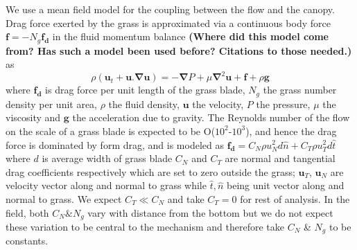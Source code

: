 \documentclass[aps,prl,twocolumn,showpacs,superscriptaddress,groupedaddress,10pt]{revtex4-1}  %
\newcommand{\bu}{\mathbf{u}}
\newcommand{\grad}{\mathbf{\nabla}}
\newcommand{\shreyas}[1]{{\bf (#1)}}
\begin{document}
We use a mean field model for the coupling between the flow and the canopy. Drag force exerted by the grass is approximated via a 
continuous body force $\mathbf{f}=-N_g\mathbf{f_d}$ in the fluid momentum balance \shreyas{Where did this model come from? Has such a model been used before? Citations to those needed.} as
\begin{equation}
\rho \left(\bu_{t}+\bu.\grad\bu \right) = -\grad P+\mu\grad^{2}\bu +\mathbf{f}+\rho\mathbf{g}
\label{navier-stokes}
\end{equation}
where $\mathbf{f_{d}}$ is drag force per unit length of the grass blade, $N_g$ the grass number density per unit area, $\rho$ the fluid density, $\mathbf{u}$ the velocity, 
$P$ the pressure, $\mu$ the viscosity and $\mathbf{g}$ the acceleration due to gravity. The Reynolds number of the flow on the scale of a grass blade is expected to be O($10^2$-$10^3$), and hence the drag force is dominated by form drag, and is modeled 
as $\mathbf{f_{d}}=C_N \rho u_{N}^{2}d\hat{n}+C_{T}\rho u_{T}^{2}d\hat{t}$ where $d$ is average width of grass blade
$C_{N}$ and $C_{T}$ are normal and tangential drag coefficients respectively which are set to zero outside the grass; $\bu_{T}$, $\bu_{N}$ are velocity vector along and
normal to grass while $\hat{t},\hat{n}$ being unit vector along and normal to grass. We expect $C_T \ll C_N$ and take $C_T=0$ for rest of analysis. In the field, both $C_N \& N_g$ vary with distance from the bottom but we do not expect these variation to be central to the mechanism and therefore take $C_N$ \& $N_g$ to be constants.
\end{document}
